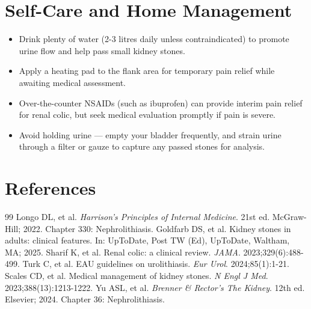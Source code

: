 \section*{Self-Care and Home Management}
\begin{itemize}
  \item Drink plenty of water (2-3 litres daily unless contraindicated) to promote urine flow and help pass small kidney stones.
  \item Apply a heating pad to the flank area for temporary pain relief while awaiting medical assessment.
  \item Over-the-counter NSAIDs (such as ibuprofen) can provide interim pain relief for renal colic, but seek medical evaluation promptly if pain is severe.
  \item Avoid holding urine — empty your bladder frequently, and strain urine through a filter or gauze to capture any passed stones for analysis.
\end{itemize}

\section*{References}

\begin{thebibliography}{99}
 Longo DL, et al. \emph{Harrison's Principles of Internal Medicine}. 21st ed. McGraw-Hill; 2022. Chapter 330: Nephrolithiasis.
 Goldfarb DS, et al. Kidney stones in adults: clinical features. In: UpToDate, Post TW (Ed), UpToDate, Waltham, MA; 2025.
 Sharif K, et al. Renal colic: a clinical review. \emph{JAMA}. 2023;329(6):488-499.
 Turk C, et al. EAU guidelines on urolithiasis. \emph{Eur Urol}. 2024;85(1):1-21.
 Scales CD, et al. Medical management of kidney stones. \emph{N Engl J Med}. 2023;388(13):1213-1222.
 Yu ASL, et al. \emph{Brenner \& Rector's The Kidney}. 12th ed. Elsevier; 2024. Chapter 36: Nephrolithiasis.
\end{thebibliography}
